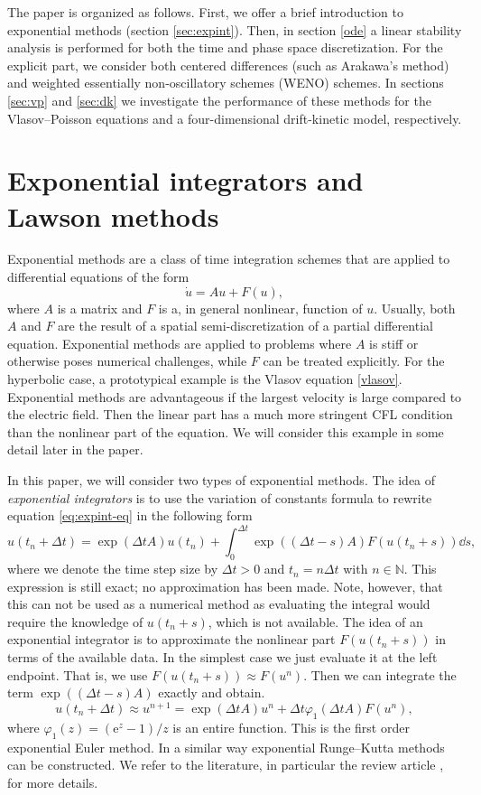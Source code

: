 The paper is organized as follows. First, we offer a brief introduction to exponential methods (section \ref{sec:expint}). Then, in section \ref{ode} a linear stability analysis is performed for both the time and phase space discretization. For the explicit part, we consider both centered differences (such as Arakawa's method) and weighted essentially non-oscillatory schemes (WENO) schemes. In sections \ref{sec:vp} and \ref{sec:dk} we investigate the performance of these methods for the Vlasov--Poisson equations and a four-dimensional drift-kinetic model, respectively. 

\section{Exponential integrators and Lawson methods\label{sec:expint}}

Exponential methods are a class of time integration schemes that are applied to differential equations of the form
\begin{equation}
  \label{eq:expint-eq}
  \dot{u} = Au + F(u),
\end{equation}
where $A$ is a matrix and $F$ is a, in general nonlinear, function of $u$. Usually, both $A$ and $F$ are the result of a spatial semi-discretization of a partial differential equation. Exponential methods are applied to problems where $A$ is stiff or otherwise poses numerical challenges, while $F$ can be treated explicitly. For the hyperbolic case, a prototypical example is the Vlasov equation \eqref{vlasov}. Exponential methods are advantageous if the largest velocity is large compared to the electric field. Then the linear part has a much more stringent CFL condition than the nonlinear part of the equation. We will consider this example in some detail later in the paper.

In this paper, we will consider two types of exponential methods. The idea of \textit{exponential integrators} is to use the variation of constants formula to rewrite equation \eqref{eq:expint-eq} in the following form
\[
  u(t_n+\Delta t) = \exp(\Delta t A) u(t_n) + \int_0^{\Delta t} \exp((\Delta t -s)A) F(u(t_n+s)) \dd{s},
\]
where we denote the time step size by $\Delta t >0$ and $t_n = n\Delta t$ with $n\in\mathbb{N}$. This expression is still exact; \ie no approximation has been made. Note, however, that this can not be used as a numerical method as evaluating the integral would require the knowledge of $u(t_n+s)$, which is not available. The idea of an exponential integrator is to approximate the nonlinear part $F(u(t_n+s))$ in terms of the available data. In the simplest case we just evaluate it at the left endpoint. That is, we use $F(u(t_n+s))\approx F(u^n)$. Then we can integrate the term $\exp((\Delta t -s)A)$ exactly and obtain.
\[
  u(t_n+\Delta t) \approx u^{n+1} = \exp(\Delta t A) u^n + \Delta t \varphi_1(\Delta t A) F(u^n),
\]
where $\varphi_1(z)=(\mathrm{e}^z-1)/z$ is an entire function. This is the first order exponential Euler method. In a similar way exponential Runge--Kutta methods can be constructed. We refer to the literature, in particular the review article \cite{Hochbruck:2010}, for more details.

